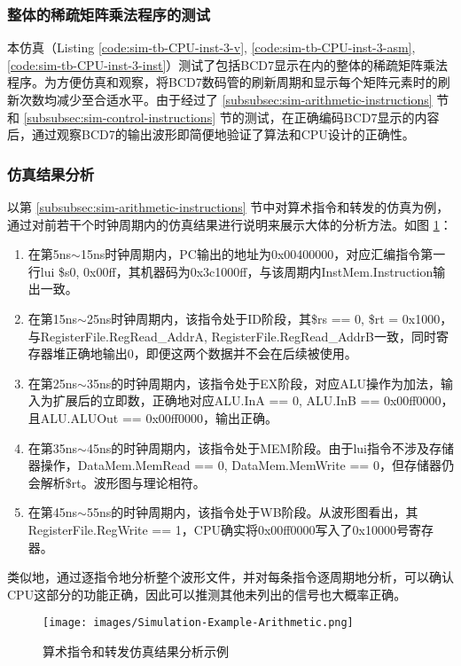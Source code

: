 \subsubsection{整体的稀疏矩阵乘法程序的测试}
本仿真（Listing \ref{code:sim-tb-CPU-inst-3-v}, \ref{code:sim-tb-CPU-inst-3-asm}, \ref{code:sim-tb-CPU-inst-3-inst}）测试了包括BCD7显示在内的整体的稀疏矩阵乘法程序。为方便仿真和观察，将BCD7数码管的刷新周期和显示每个矩阵元素时的刷新次数均减少至合适水平。由于经过了 \ref{subsubsec:sim-arithmetic-instructions} 节和 \ref{subsubsec:sim-control-instructions} 节的测试，在正确编码BCD7显示的内容后，通过观察BCD7的输出波形即简便地验证了算法和CPU设计的正确性。

\subsubsection{仿真结果分析}
以第 \ref{subsubsec:sim-arithmetic-instructions} 节中对算术指令和转发的仿真为例，通过对前若干个时钟周期内的仿真结果进行说明来展示大体的分析方法。如图 \ref{fig:sim-example-arithmetic}：
\begin{enumerate}
    \item 在第5ns$\sim$15ns时钟周期内，PC输出的地址为0x00400000，对应汇编指令第一行lui \$s0, 0x00ff，其机器码为0x3c1000ff，与该周期内InstMem.Instruction输出一致。
    \item 在第15ns$\sim$25ns时钟周期内，该指令处于ID阶段，其\$rs == 0, \$rt = 0x1000，与RegisterFile.RegRead\_AddrA, RegisterFile.RegRead\_AddrB一致，同时寄存器堆正确地输出0，即便这两个数据并不会在后续被使用。
    \item 在第25ns$\sim$35ns的时钟周期内，该指令处于EX阶段，对应ALU操作为加法，输入为扩展后的立即数，正确地对应ALU.InA == 0, ALU.InB == 0x00ff0000，且ALU.ALUOut == 0x00ff0000，输出正确。
    \item 在第35ns$\sim$45ns的时钟周期内，该指令处于MEM阶段。由于lui指令不涉及存储器操作，DataMem.MemRead == 0, DataMem.MemWrite == 0，但存储器仍会解析\$rt。波形图与理论相符。
    \item 在第45ns$\sim$55ns的时钟周期内，该指令处于WB阶段。从波形图看出，其RegisterFile.RegWrite == 1，CPU确实将0x00ff0000写入了0x10000号寄存器。
\end{enumerate}
类似地，通过逐指令地分析整个波形文件，并对每条指令逐周期地分析，可以确认CPU这部分的功能正确，因此可以推测其他未列出的信号也大概率正确。

\begin{figure}[H]
    \centering
    \texttt{[image: images/Simulation-Example-Arithmetic.png]}
    \caption{算术指令和转发仿真结果分析示例}
    \label{fig:sim-example-arithmetic}
\end{figure}

